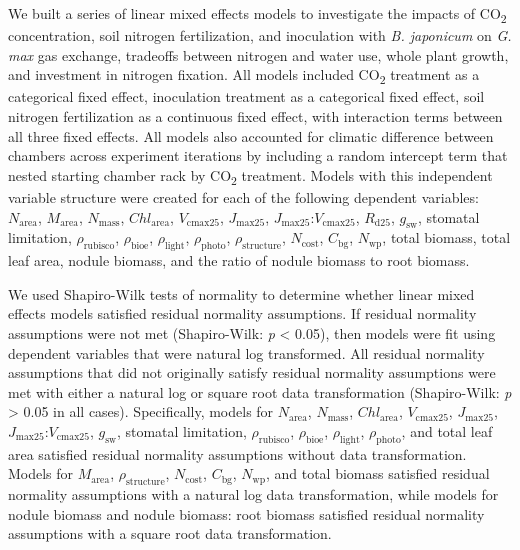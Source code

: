 We built a series of linear mixed effects models to investigate the impacts of CO\textsubscript{2} concentration, soil nitrogen fertilization, and inoculation with \textit{B. japonicum} on \textit{G. max} gas exchange, tradeoffs between nitrogen and water use, whole plant growth, and investment in nitrogen fixation. All models included CO\textsubscript{2} treatment as a categorical fixed effect, inoculation treatment as a categorical fixed effect, soil nitrogen fertilization as a continuous fixed effect, with interaction terms between all three fixed effects. All models also accounted for climatic difference between chambers across experiment iterations by including a random intercept term that nested starting chamber rack by CO\textsubscript{2} treatment. Models with this independent variable structure were created for each of the following dependent variables: $N_\mathrm{area}$, $M_\mathrm{area}$, $N_\mathrm{mass}$, $Chl_\mathrm{area}$, $V_\mathrm{cmax25}$, $J_\mathrm{max25}$, $J_\mathrm{max25}$:$V_\mathrm{cmax25}$, $R_\mathrm{d25}$, $g_\mathrm{sw}$, stomatal limitation, $\rho_\mathrm{rubisco}$, $\rho_\mathrm{bioe}$, $\rho_\mathrm{light}$, $\rho_\mathrm{photo}$, $\rho_\mathrm{structure}$, $N_\mathrm{cost}$, $C_\mathrm{bg}$, $N_\mathrm{wp}$, total biomass, total leaf area, nodule biomass, and the ratio of nodule biomass to root biomass.

We used Shapiro-Wilk tests of normality to determine whether linear mixed effects models satisfied residual normality assumptions. If residual normality assumptions were not met (Shapiro-Wilk: \textit{p} < 0.05), then models were fit using dependent variables that were natural log transformed. All residual normality assumptions that did not originally satisfy residual normality assumptions were met with either a natural log or square root data transformation (Shapiro-Wilk: \textit{p} > 0.05 in all cases). Specifically, models for $N_\mathrm{area}$, $N_\mathrm{mass}$, $Chl_\mathrm{area}$, $V_\mathrm{cmax25}$, $J_\mathrm{max25}$, $J_\mathrm{max25}$:$V_\mathrm{cmax25}$, $g_\mathrm{sw}$, stomatal limitation, $\rho_\mathrm{rubisco}$, $\rho_\mathrm{bioe}$, $\rho_\mathrm{light}$, $\rho_\mathrm{photo}$, and total leaf area satisfied residual normality assumptions without data transformation. Models for $M_\mathrm{area}$, $\rho_\mathrm{structure}$, $N_\mathrm{cost}$, $C_\mathrm{bg}$, $N_\mathrm{wp}$, and total biomass satisfied residual normality assumptions with a natural log data transformation, while models for nodule biomass and nodule biomass: root biomass satisfied residual normality assumptions with a square root data transformation.

